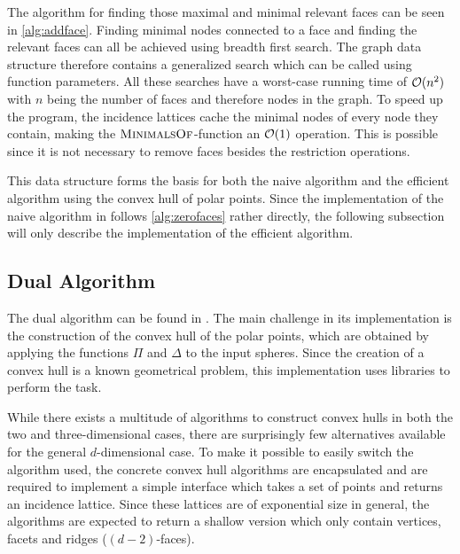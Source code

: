 The algorithm for finding those maximal and minimal relevant faces can be seen in \cref{alg:addface}.
Finding minimal nodes connected to a face and finding the relevant faces can all be achieved using breadth first search.
The graph data structure therefore contains a generalized search which can be called using function parameters.
All these searches have a worst-case running time of $\mathcal{O}(n^2)$ with $n$ being the number of faces and therefore nodes in the graph.
To speed up the program, the incidence lattices cache the minimal nodes of every node they contain, making the $\textsc{MinimalsOf}$-function an $\mathcal{O}(1)$ operation.
This is possible since it is not necessary to remove faces besides the restriction operations.

This data structure forms the basis for both the naive algorithm and the efficient algorithm using the convex hull of polar points.
Since the implementation of the naive algorithm in  follows \cref{alg:zerofaces} rather directly, the following subsection will only describe the implementation of the efficient algorithm.

\subsection{Dual Algorithm}
\label{sub:impl_dual_algorithm}
The dual algorithm can be found in .
The main challenge in its implementation is the construction of the convex hull of the polar points, which are obtained by applying the functions $\Pi$ and $\Delta$ to the input spheres.
Since the creation of a convex hull is a known geometrical problem, this implementation uses libraries to perform the task.

While there exists a multitude of algorithms to construct convex hulls in both the two and three-dimensional cases, there are surprisingly few alternatives available for the general $d$-dimensional case.
To make it possible to easily switch the algorithm used, the concrete convex hull algorithms are encapsulated and are required to implement a simple interface which takes a set of points and returns an incidence lattice.
Since these lattices are of exponential size in general, the algorithms are expected to return a shallow version which only contain vertices, facets and ridges ($(d-2)$-faces).

